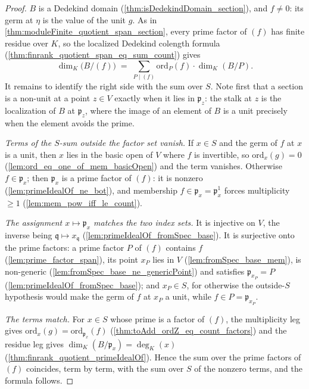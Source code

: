 \begin{proof}
  \leanok
  \(B\) is a Dedekind domain (\ref{thm:isDedekindDomain_section}), and \(f \neq 0\):
  its germ at \(\eta\) is the value of the unit \(g\). As in
  \ref{thm:moduleFinite_quotient_span_section}, every prime factor of \((f)\) has
  finite residue over \(K\), so the localized Dedekind colength formula
  (\ref{thm:finrank_quotient_span_eq_sum_count}) gives
  \[
    \dim_K\bigl(B/(f)\bigr) \;=\;
      \sum_{P \mid (f)} \mathrm{ord}_P(f) \cdot \dim_K(B/P) .
  \]
  It remains to identify the right side with the sum over \(S\). Note first that a
  section is a non-unit at a point \(z \in V\) exactly when it lies in
  \(\mathfrak p_z\): the stalk at \(z\) is the localization of \(B\) at
  \(\mathfrak p_z\), where the image of an element of \(B\) is a unit precisely when
  the element avoids the prime.

  \emph{Terms of the \(S\)-sum outside the factor set vanish.} If \(x \in S\) and the
  germ of \(f\) at \(x\) is a unit, then \(x\) lies in the basic open of \(V\) where
  \(f\) is invertible, so \(\mathrm{ord}_x(g) = 0\)
  (\ref{lem:ord_eq_one_of_mem_basicOpen}) and the term vanishes. Otherwise
  \(f \in \mathfrak p_x\); then \(\mathfrak p_x\) is a prime factor of \((f)\): it is
  nonzero (\ref{lem:primeIdealOf_ne_bot}), and membership \(f \in \mathfrak p_x =
  \mathfrak p_x^1\) forces multiplicity \(\ge 1\)
  (\ref{lem:mem_pow_iff_le_count}).

  \emph{The assignment \(x \mapsto \mathfrak p_x\) matches the two index sets.} It is
  injective on \(V\), the inverse being \(\mathfrak q \mapsto x_{\mathfrak q}\)
  (\ref{lem:primeIdealOf_fromSpec_base}). It is surjective onto the prime factors:
  a prime factor \(P\) of \((f)\) contains \(f\) (\ref{lem:prime_factor_span}), its
  point \(x_P\) lies in \(V\) (\ref{lem:fromSpec_base_mem}), is non-generic
  (\ref{lem:fromSpec_base_ne_genericPoint}) and satisfies \(\mathfrak p_{x_P} = P\)
  (\ref{lem:primeIdealOf_fromSpec_base}); and \(x_P \in S\), for otherwise the
  outside-\(S\) hypothesis would make the germ of \(f\) at \(x_P\) a unit, while
  \(f \in P = \mathfrak p_{x_P}\).

  \emph{The terms match.} For \(x \in S\) whose prime is a factor of \((f)\), the
  multiplicity leg gives \(\mathrm{ord}_x(g) = \mathrm{ord}_{\mathfrak p_x}(f)\)
  (\ref{thm:toAdd_ordZ_eq_count_factors}) and the residue leg gives
  \(\dim_K(B/\mathfrak p_x) = \deg_K(x)\)
  (\ref{thm:finrank_quotient_primeIdealOf}). Hence the sum over the prime factors of
  \((f)\) coincides, term by term, with the sum over \(S\) of the nonzero terms, and
  the formula follows.
\end{proof}


